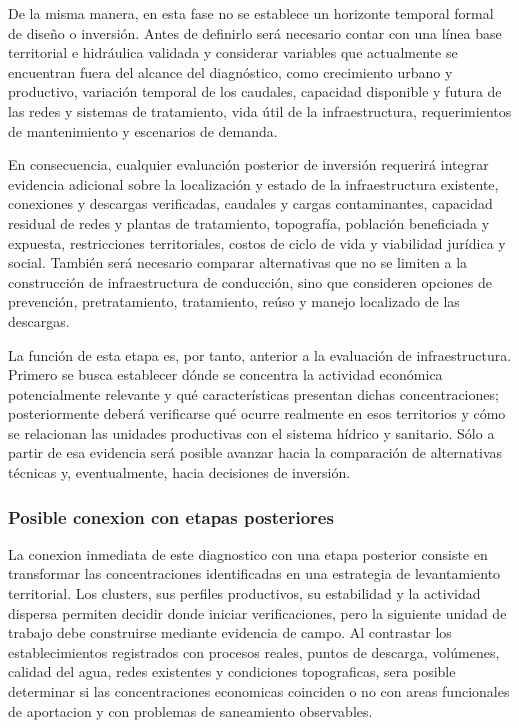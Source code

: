 \documentclass[11pt,letterpaper]{article}
\begin{document}
De la misma manera, en esta fase no se establece un horizonte temporal formal de diseño o inversión. Antes de definirlo será necesario contar con una línea base territorial e hidráulica validada y considerar variables que actualmente se encuentran fuera del alcance del diagnóstico, como crecimiento urbano y productivo, variación temporal de los caudales, capacidad disponible y futura de las redes y sistemas de tratamiento, vida útil de la infraestructura, requerimientos de mantenimiento y escenarios de demanda.

En consecuencia, cualquier evaluación posterior de inversión requerirá integrar evidencia adicional sobre la localización y estado de la infraestructura existente, conexiones y descargas verificadas, caudales y cargas contaminantes, capacidad residual de redes y plantas de tratamiento, topografía, población beneficiada y expuesta, restricciones territoriales, costos de ciclo de vida y viabilidad jurídica y social. También será necesario comparar alternativas que no se limiten a la construcción de infraestructura de conducción, sino que consideren opciones de prevención, pretratamiento, tratamiento, reúso y manejo localizado de las descargas.

La función de esta etapa es, por tanto, anterior a la evaluación de infraestructura. Primero se busca establecer dónde se concentra la actividad económica potencialmente relevante y qué características presentan dichas concentraciones; posteriormente deberá verificarse qué ocurre realmente en esos territorios y cómo se relacionan las unidades productivas con el sistema hídrico y sanitario. Sólo a partir de esa evidencia será posible avanzar hacia la comparación de alternativas técnicas y, eventualmente, hacia decisiones de inversión.



\subsubsection*{Posible conexion con etapas posteriores}

La conexion inmediata de este diagnostico con una etapa posterior consiste en transformar las concentraciones identificadas en una estrategia de levantamiento territorial. Los clusters, sus perfiles productivos, su estabilidad y la actividad dispersa permiten decidir donde iniciar verificaciones, pero la siguiente unidad de trabajo debe construirse mediante evidencia de campo. Al contrastar los establecimientos registrados con procesos reales, puntos de descarga, volúmenes, calidad del agua, redes existentes y condiciones topograficas, sera posible determinar si las concentraciones economicas coinciden o no con areas funcionales de aportacion y con problemas de saneamiento observables.
\end{document}
